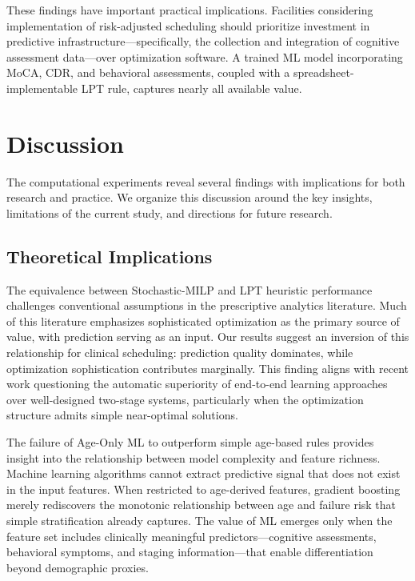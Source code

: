 These findings have important practical implications. Facilities considering implementation of risk-adjusted scheduling should prioritize investment in predictive infrastructure---specifically, the collection and integration of cognitive assessment data---over optimization software. A trained ML model incorporating MoCA, CDR, and behavioral assessments, coupled with a spreadsheet-implementable LPT rule, captures nearly all available value.


\section{Discussion}
\label{sec:discussion}

The computational experiments reveal several findings with implications for both research and practice. We organize this discussion around the key insights, limitations of the current study, and directions for future research.

\subsection{Theoretical Implications}

The equivalence between Stochastic-MILP and LPT heuristic performance challenges conventional assumptions in the prescriptive analytics literature. Much of this literature emphasizes sophisticated optimization as the primary source of value, with prediction serving as an input. Our results suggest an inversion of this relationship for clinical scheduling: prediction quality dominates, while optimization sophistication contributes marginally. This finding aligns with recent work questioning the automatic superiority of end-to-end learning approaches over well-designed two-stage systems, particularly when the optimization structure admits simple near-optimal solutions.

The failure of Age-Only ML to outperform simple age-based rules provides insight into the relationship between model complexity and feature richness. Machine learning algorithms cannot extract predictive signal that does not exist in the input features. When restricted to age-derived features, gradient boosting merely rediscovers the monotonic relationship between age and failure risk that simple stratification already captures. The value of ML emerges only when the feature set includes clinically meaningful predictors---cognitive assessments, behavioral symptoms, and staging information---that enable differentiation beyond demographic proxies.

